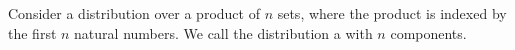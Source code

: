 


Consider a distribution over a product
of $n$ sets, where the product is indexed
by the first $n$ natural numbers.
We call the distribution a
 with
$n$ components.
